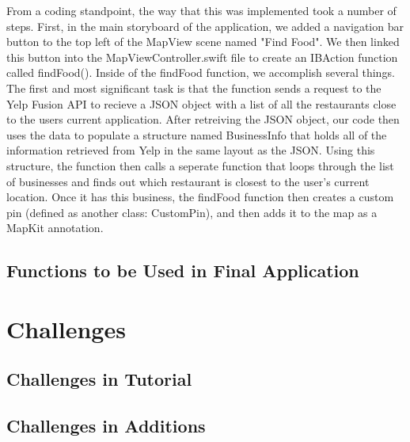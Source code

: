 \documentclass[conference]{IEEEtran}
\begin{document}
From a coding standpoint, the way that this was implemented took a number of steps.
First, in the main storyboard of the application, we added a navigation bar button
to the top left of the MapView scene named "Find Food". We then linked this button
into the MapViewController.swift file to create an IBAction function called findFood().
Inside of the findFood function, we accomplish several things. The first and 
most significant task is that the function sends a request to the Yelp Fusion API
to recieve a JSON object with a list of all the restaurants close to the users current
application. After retreiving the JSON object, our code then uses the data to populate
a structure named BusinessInfo that holds all of the information retrieved from Yelp
in the same layout as the JSON. Using this structure, the function then calls a seperate
function that loops through the list of businesses and finds out which restaurant
is closest to the user's current location. Once it has this business, the findFood
function then creates a custom pin (defined as another class: CustomPin), and then
adds it to the map as a MapKit annotation.

\subsection{Functions to be Used in Final Application}

\section{Challenges}

\subsection{Challenges in Tutorial}

\subsection{Challenges in Additions}
\end{document}
